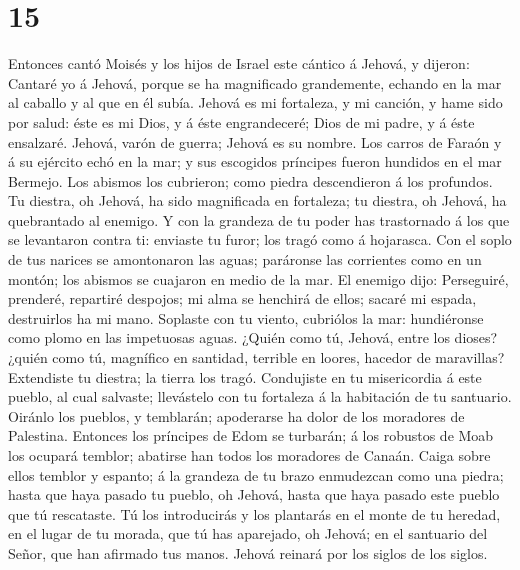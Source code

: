 \hypertarget{section-14}{%
\section{15}\label{section-14}}

 Entonces cantó Moisés y los hijos de Israel este cántico á
Jehová, y dijeron: Cantaré yo á Jehová, porque se ha magnificado
grandemente, echando en la mar al caballo y al que en él subía.
 Jehová es mi fortaleza, y mi canción, y hame sido por
salud: éste es mi Dios, y á éste engrandeceré; Dios de mi padre, y á
éste ensalzaré.  Jehová, varón de guerra; Jehová es su
nombre.  Los carros de Faraón y á su ejército echó en la
mar; y sus escogidos príncipes fueron hundidos en el mar Bermejo.
 Los abismos los cubrieron; como piedra descendieron á los
profundos.  Tu diestra, oh Jehová, ha sido magnificada en
fortaleza; tu diestra, oh Jehová, ha quebrantado al enemigo.
 Y con la grandeza de tu poder has trastornado á los que se
levantaron contra ti: enviaste tu furor; los tragó como á hojarasca.
 Con el soplo de tus narices se amontonaron las aguas;
paráronse las corrientes como en un montón; los abismos se cuajaron en
medio de la mar.  El enemigo dijo: Perseguiré, prenderé,
repartiré despojos; mi alma se henchirá de ellos; sacaré mi espada,
destruirlos ha mi mano.  Soplaste con tu viento, cubriólos
la mar: hundiéronse como plomo en las impetuosas aguas. 
¿Quién como tú, Jehová, entre los dioses? ¿quién como tú, magnífico en
santidad, terrible en loores, hacedor de maravillas? 
Extendiste tu diestra; la tierra los tragó.  Condujiste en
tu misericordia á este pueblo, al cual salvaste; llevástelo con tu
fortaleza á la habitación de tu santuario.  Oiránlo los
pueblos, y temblarán; apoderarse ha dolor de los moradores de Palestina.
 Entonces los príncipes de Edom se turbarán; á los robustos
de Moab los ocupará temblor; abatirse han todos los moradores de Canaán.
 Caiga sobre ellos temblor y espanto; á la grandeza de tu
brazo enmudezcan como una piedra; hasta que haya pasado tu pueblo, oh
Jehová, hasta que haya pasado este pueblo que tú rescataste.
 Tú los introducirás y los plantarás en el monte de tu
heredad, en el lugar de tu morada, que tú has aparejado, oh Jehová; en
el santuario del Señor, que han afirmado tus manos.  Jehová
reinará por los siglos de los siglos.

